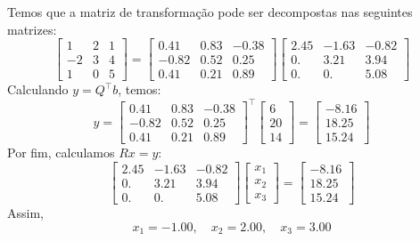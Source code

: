 \begin{resolution}
  Temos que a matriz de transformação pode ser decompostas nas seguintes matrizes:
  $$\begin{bmatrix}
      1 & 2 & 1 \\ -2 & 3 & 4 \\ 1 & 0 & 5
    \end{bmatrix} = \begin{bmatrix}
      0.41  & 0.83 & -0.38 \\
      -0.82 & 0.52 & 0.25  \\
      0.41  & 0.21 & 0.89
    \end{bmatrix}
    \begin{bmatrix}
      2.45 & -1.63 & -0.82 \\
      0.   & 3.21  & 3.94  \\
      0.   & 0.    & 5.08
    \end{bmatrix}$$
  Calculando $y = Q^{\top}b$, temos:
  \begin{equation*}
    y = \begin{bmatrix}
      0.41  & 0.83 & -0.38 \\
      -0.82 & 0.52 & 0.25  \\
      0.41  & 0.21 & 0.89
    \end{bmatrix} ^{\top} \begin{bmatrix}
      6 \\ 20 \\ 14
    \end{bmatrix} = \begin{bmatrix}
      -8.16 \\
      18.25 \\
      15.24
    \end{bmatrix}
  \end{equation*}
  Por fim, calculamos $Rx = y$:
  \begin{equation*}
    \begin{bmatrix}
      2.45 & -1.63 & -0.82 \\
      0.   & 3.21  & 3.94  \\
      0.   & 0.    & 5.08
    \end{bmatrix}
    \begin{bmatrix}
      x_1 \\ x_2 \\ x_3
    \end{bmatrix} = \begin{bmatrix}
      -8.16 \\
      18.25 \\
      15.24
    \end{bmatrix}
  \end{equation*}
  Assim,
  \begin{equation}
    x_1 = -1.00, \quad x_2 = 2.00, \quad x_3 = 3.00
  \end{equation}

\end{resolution}

